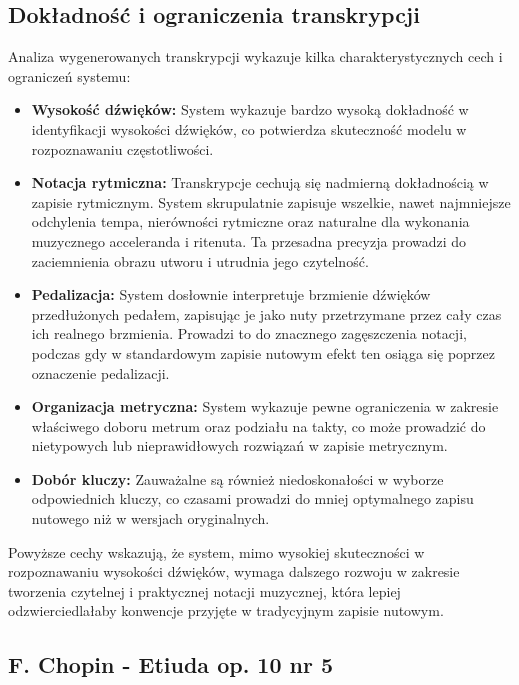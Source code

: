 \documentclass[a4paper,twoside,12pt]{book}
\begin{document}
\subsection{Dokładność i ograniczenia transkrypcji}
Analiza wygenerowanych transkrypcji wykazuje kilka charakterystycznych cech i ograniczeń systemu:

\begin{itemize}
    \item \textbf{Wysokość dźwięków:} System wykazuje bardzo wysoką dokładność w identyfikacji wysokości dźwięków, co potwierdza skuteczność modelu w rozpoznawaniu częstotliwości.
    
    \item \textbf{Notacja rytmiczna:} Transkrypcje cechują się nadmierną dokładnością w zapisie rytmicznym. System skrupulatnie zapisuje wszelkie, nawet najmniejsze odchylenia tempa, nierówności rytmiczne oraz naturalne dla wykonania muzycznego acceleranda i ritenuta. Ta przesadna precyzja prowadzi do zaciemnienia obrazu utworu i utrudnia jego czytelność.
    
    \item \textbf{Pedalizacja:} System dosłownie interpretuje brzmienie dźwięków przedłużonych pedałem, zapisując je jako nuty przetrzymane przez cały czas ich realnego brzmienia. Prowadzi to do znacznego zagęszczenia notacji, podczas gdy w standardowym zapisie nutowym efekt ten osiąga się poprzez oznaczenie pedalizacji.
    
    \item \textbf{Organizacja metryczna:} System wykazuje pewne ograniczenia w zakresie właściwego doboru metrum oraz podziału na takty, co może prowadzić do nietypowych lub nieprawidłowych rozwiązań w zapisie metrycznym.
    
    \item \textbf{Dobór kluczy:} Zauważalne są również niedoskonałości w wyborze odpowiednich kluczy, co czasami prowadzi do mniej optymalnego zapisu nutowego niż w wersjach oryginalnych.
\end{itemize}

Powyższe cechy wskazują, że system, mimo wysokiej skuteczności w rozpoznawaniu wysokości dźwięków, wymaga dalszego rozwoju w zakresie tworzenia czytelnej i praktycznej notacji muzycznej, która lepiej odzwierciedlałaby konwencje przyjęte w tradycyjnym zapisie nutowym.

\newpage
\subsection{F. Chopin - Etiuda op. 10 nr 5}
\end{document}
